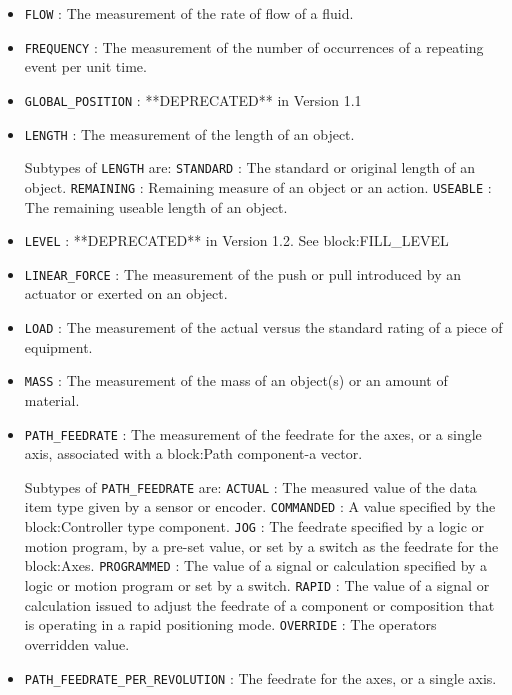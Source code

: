 \begin{itemize}
\item \texttt{FLOW} : The measurement of the rate of flow of a fluid. 

\item \texttt{FREQUENCY} : The measurement of the number of occurrences of a repeating event per unit time. 

\item \texttt{GLOBAL_POSITION} : **DEPRECATED** in Version 1.1 

\item \texttt{LENGTH} : The measurement of the length of an object. 

Subtypes of \texttt{LENGTH} are: 
\newline\tab \texttt{STANDARD} : The standard or original length of an object. 
\newline\tab \texttt{REMAINING} : Remaining measure of an object or an action. 
\newline\tab \texttt{USEABLE} : The remaining useable length of an object. 
\item \texttt{LEVEL} : **DEPRECATED** in Version 1.2.  See {block:FILL_LEVEL} 

\item \texttt{LINEAR_FORCE} : The measurement of the push or pull introduced by an actuator or exerted on an object. 

\item \texttt{LOAD} : The measurement of the actual versus the standard rating of a piece of equipment. 

\item \texttt{MASS} : The measurement of the mass of an object(s) or an amount of material. 

\item \texttt{PATH_FEEDRATE} : The measurement of the feedrate for the axes, or a single axis, associated with a {block:Path} component-a vector. 

Subtypes of \texttt{PATH_FEEDRATE} are: 
\newline\tab \texttt{ACTUAL} : The measured value of the data item type given by a sensor or encoder. 
\newline\tab \texttt{COMMANDED} : A value specified by the {block:Controller} type component. 
\newline\tab \texttt{JOG} : The feedrate specified by a logic or motion program, by a pre-set value, or set by a switch as the feedrate for the {block:Axes}.  
\newline\tab \texttt{PROGRAMMED} : The value of a signal or calculation specified by a logic or motion program or set by a switch. 
\newline\tab \texttt{RAPID} : The value of a signal or calculation issued to adjust the feedrate of a component or composition that is operating in a rapid positioning mode. 
\newline\tab \texttt{OVERRIDE} : The operators overridden value. 
\item \texttt{PATH_FEEDRATE_PER_REVOLUTION} : The feedrate for the axes, or a single axis. 


\end{itemize}
